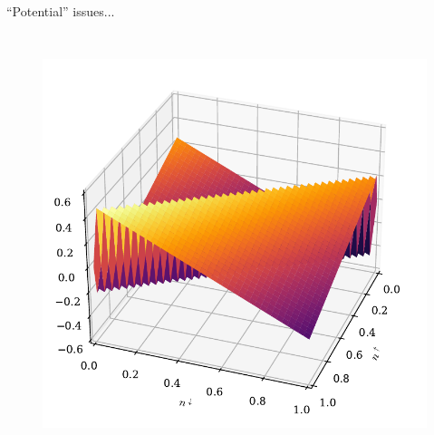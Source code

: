 \documentclass[xcolor=table,aspectratio=169]{beamer}
\numberwithin{equation}{section}
\begin{document}
\begin{frame}{``Potential'' issues...}
\begin{columns}
        \begin{figure}[t!]
            \includegraphics[width=\columnwidth]{figures/novel_u_potential.pdf}
            \label{fig:novel_u_potential}
        \end{figure}
    \end{columns}

\end{frame}
\end{document}
